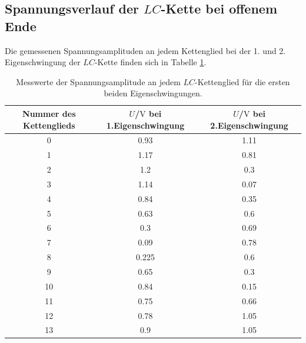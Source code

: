 \subsection{Spannungsverlauf der $LC$-Kette bei offenem Ende}
Die gemessenen Spannungsamplituden an jedem Kettenglied bei der 1. und 2. Eigenschwingung der $LC$-Kette finden sich in Tabelle \ref{tab:ei}.

\begin{table}
   \centering
\caption{Messwerte der Spannungsamplitude an jedem $LC$-Kettenglied für die ersten beiden Eigenschwingungen.}
\label{tab:ei}
\begin{tabular}{ccc}
  \toprule
Nummer des Kettenglieds & $U$/$\si{\volt}$ bei 1.Eigenschwingung & $U$/$\si{\volt}$ bei 2.Eigenschwingung \\
\midrule
0 & 0.93 & 1.11 \\
1 & 1.17 & 0.81 \\
2 & 1.2 & 0.3 \\
3 & 1.14 & 0.07 \\
4 & 0.84 & 0.35 \\
5 & 0.63 & 0.6 \\
6 & 0.3 & 0.69 \\
7 & 0.09 & 0.78 \\
8 & 0.225 & 0.6 \\
9 & 0.65 & 0.3 \\
10 & 0.84 & 0.15 \\
11 & 0.75 & 0.66 \\
12 & 0.78 & 1.05 \\
13 & 0.9 & 1.05 \\
\bottomrule
\end{tabular}
\end{table}


